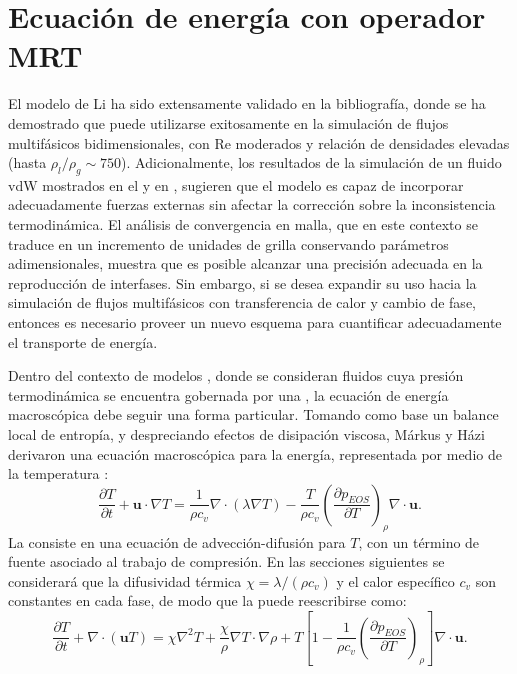 \section{Ecuaci\'on de energ\'ia con operador MRT}
El modelo \pp{} de Li ha sido extensamente validado en la bibliograf\'ia, donde se ha demostrado que puede utilizarse exitosamente en la simulaci\'on de flujos multif\'asicos bidimensionales, con Re moderados y relaci\'on de densidades elevadas (hasta $\rho_l / \rho_g \sim 750$). Adicionalmente, los resultados de la simulaci\'on de un fluido vdW mostrados en el  y en \cite{fogliatto_simulation_2019}, sugieren que el modelo es capaz de incorporar adecuadamente fuerzas externas sin afectar la correcci\'on sobre la inconsistencia termodin\'amica. El an\'alisis de convergencia en malla, que en este contexto se traduce en un incremento de unidades de grilla conservando par\'ametros adimensionales, muestra que es posible alcanzar una precisi\'on adecuada en la reproducci\'on de interfases. Sin embargo, si se desea expandir su uso hacia la simulaci\'on de flujos multif\'asicos con transferencia de calor y cambio de fase, entonces es necesario proveer un nuevo esquema para cuantificar adecuadamente el transporte de energ\'ia.

Dentro del contexto de modelos \pps{}, donde se consideran fluidos cuya presi\'on termodin\'amica se encuentra gobernada por una \eos{}, la ecuaci\'on de energ\'ia macrosc\'opica debe seguir una forma particular. Tomando como base un balance local de entrop\'ia, y despreciando efectos de disipaci\'on viscosa, M\'arkus y H\'azi derivaron una ecuaci\'on macrosc\'opica para la energ\'ia, representada por medio de la temperatura \cite{markus_simulation_2011}:
\begin{equation}
	\dfrac{\partial T}{\partial t} + \bm{u} \cdot \nabla T = \dfrac{1}{\rho c_v} \nabla \cdot(\lambda \nabla T) - \dfrac{T}{\rho c_v} \left( \dfrac{\partial p_{EOS}}{\partial T} \right)_{\rho} \nabla \cdot \bm{u}.
	\label{eq:markus_orig}
\end{equation}
La  consiste en una ecuaci\'on de advecci\'on-difusi\'on para $T$, con un t\'ermino de fuente asociado al trabajo de compresi\'on. En las secciones siguientes se considerar\'a que la difusividad t\'ermica $\chi = \lambda/(\rho c_v)$ y el calor espec\'ifico $c_v$ son constantes en cada fase, de modo que la  puede reescribirse como:
\begin{equation}
	\dfrac{\partial T}{\partial t} + \nabla \cdot (\bm{u} T) = \chi \nabla^2 T  + \dfrac{\chi}{\rho} \nabla T \cdot \nabla \rho + T \left[ 1 - \dfrac{1}{\rho c_v} \left( \dfrac{\partial p_{EOS}}{\partial T} \right)_{\rho} \right] \nabla \cdot \bm{u}.
	\label{eq:markus}
\end{equation}

